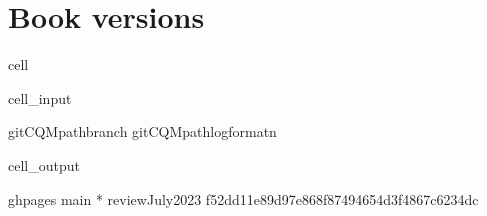 \documentclass[letterpaper,table,10pt,english]{jupyterBook}
\begin{document}
\section{Book versions}
\label{\detokenize{tests/build_versions_checks:book-versions}}
\begin{sphinxuseclass}{cell}\begin{sphinxVerbatimInput}

\begin{sphinxuseclass}{cell_input}
\begin{sphinxVerbatim}[commandchars=\\\{\}]
  
git\PYGZhy{}CQMpathbranch
git\PYGZhy{}CQMpathlog\PYGZhy{}\PYGZhy{}format\PYGZhy{}n
\end{sphinxVerbatim}

\end{sphinxuseclass}\end{sphinxVerbatimInput}
\begin{sphinxVerbatimOutput}

\begin{sphinxuseclass}{cell_output}
\begin{sphinxVerbatim}[commandchars=\\\{\}]
  gh\PYGZhy{}pages
  main
* 
  reviewJuly2023
f52dd11e89d97e868f87494654d3f4867c6234dc
\end{sphinxVerbatim}

\end{sphinxuseclass}\end{sphinxVerbatimOutput}

\end{sphinxuseclass}
\end{document}
